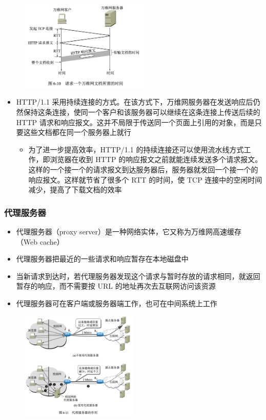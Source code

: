 \documentclass[cs4size,a4paper,10pt]{ctexart}
\begin{document}
	\begin{figure}[H]
		\centering
		\includegraphics[width=0.55\textwidth]{img/6.10}
	\end{figure}

	\begin{itemize}
		\item HTTP/1.1 采用持续连接的方式。在该方式下，万维网服务器在发送响应后仍然保持这条连接，使同一个客户和该服务器可以继续在这条连接上传送后续的 HTTP 请求和响应报文。这并不局限于传送同一个页面上引用的对象，而是只要这些文档都在同一个服务器上就行
		\begin{itemize}
			\item 为了进一步提高效率，HTTP/1.1 的持续连接还可以使用流水线方式工作，即浏览器在收到 HTTP 的响应报文之前就能连续发送多个请求报文。这样的一个接一个的请求报文到达服务器后，服务器就发回一个接一个的响应报文。这样就节省了很多个 RTT 的时间，使 TCP 连接中的空闲时间减少，提高了下载文档的效率
		\end{itemize}
	\end{itemize}


	\subsubsection{代理服务器}
	\begin{itemize}
		\item 代理服务器（proxy server）是一种网络实体，它又称为万维网高速缓存（Web cache）
		\item 代理服务器把最近的一些请求和响应暂存在本地磁盘中
		\item 当新请求到达时，若代理服务器发现这个请求与暂时存放的请求相同，就返回暂存的响应，而不需要按 URL 的地址再次去互联网访问该资源
		\item 代理服务器可在客户端或服务器端工作，也可在中间系统上工作
	\end{itemize}

	\begin{figure}[H]
		\centering
		\includegraphics[width=0.5\textwidth]{img/6.11}
	\end{figure}
\end{document}
